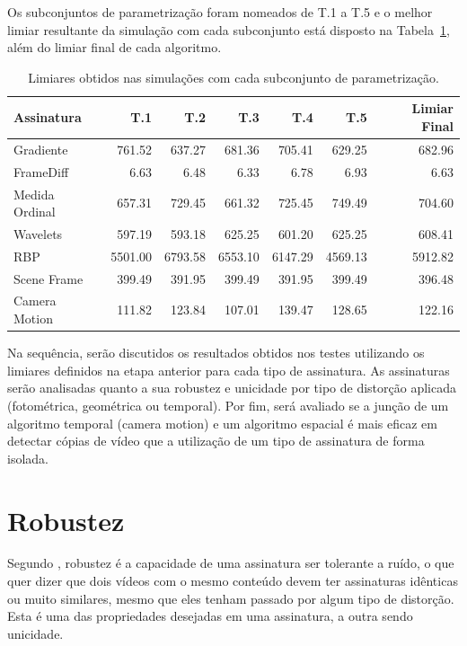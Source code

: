 Os subconjuntos de parametrização foram nomeados de T.1 a T.5 e o melhor limiar resultante da simulação com cada subconjunto está disposto na Tabela~\ref{tab:limiares}, além do limiar final de cada algoritmo.

\begin{table}[h]
	\caption{Limiares obtidos nas simulações com cada subconjunto de parametrização.}
	\label{tab:limiares}
	\begin{tabular}{|l|r|r|r|r|r|r|}
		\hline
		\textbf{Assinatura} & \textbf{T.1} & \textbf{T.2} & \textbf{T.3} & \textbf{T.4} & \textbf{T.5} & \textbf{Limiar Final}\\ \hline
		Gradiente & 761.52 & 637.27 & 681.36 & 705.41 & 629.25 & 682.96\\ \hline
		FrameDiff & 6.63 & 6.48 & 6.33 & 6.78 & 6.93 & 6.63\\ \hline
		Medida Ordinal & 657.31 & 729.45 & 661.32 & 725.45 & 749.49 & 704.60\\ \hline
		Wavelets & 597.19 & 593.18 & 625.25 & 601.20 & 625.25 & 608.41\\ \hline
		RBP & 5501.00 & 6793.58 & 6553.10 & 6147.29 & 4569.13 & 5912.82\\ \hline
		Scene Frame & 399.49 & 391.95 & 399.49 & 391.95 & 399.49 & 396.48\\ \hline
		Camera Motion & 111.82 & 123.84 & 107.01 & 139.47 & 128.65 & 122.16\\ \hline
	\end{tabular}
\end{table}

Na sequência, serão discutidos os resultados obtidos nos testes utilizando os limiares definidos na etapa anterior para cada tipo de assinatura. As assinaturas serão analisadas quanto a sua robustez e unicidade por tipo de distorção aplicada (fotométrica, geométrica ou temporal). Por fim, será avaliado se a junção de um algoritmo temporal (camera motion) e um algoritmo espacial é mais eficaz em detectar cópias de vídeo que a utilização de um tipo de assinatura de forma isolada. 

\section{Robustez}

Segundo , robustez é a capacidade de uma assinatura ser tolerante a ruído, o que quer dizer que dois vídeos com o mesmo conteúdo devem ter assinaturas idênticas ou muito similares, mesmo que eles tenham passado por algum tipo de distorção. Esta é uma das propriedades desejadas em uma assinatura, a outra sendo unicidade.

